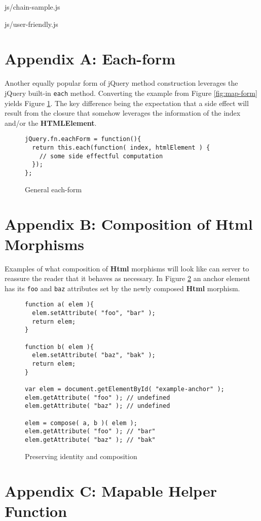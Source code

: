 \documentclass[preprint]{sigplanconf}
\begin{document}
\begin{lstinputlisting}[
    language=JavaScript,
    caption={Sources of Html objects},
    label={lst:chain-sample}
]{js/chain-sample.js}
\begin{lstinputlisting}[
    language=JavaScript,
    caption={User friendly overhead},
    label={lst:user-friendly}
]{js/user-friendly.js}
\appendix
\section{Appendix A: Each-form}

Another equally popular form of jQuery method construction leverages the jQuery built-in \verb|each| method. Converting the example from Figure \ref{fig:map-form} yields Figure \ref{fig:each-form}. The key difference being the expectation that a side effect will result from the closure that somehow leverages the information of the index and/or the \textbf{HTMLElement}.

\begin{figure}[!ht]
\small
\begin{verbatim}
jQuery.fn.eachForm = function(){
  return this.each(function( index, htmlElement ) {
    // some side effectful computation
  });
};
\end{verbatim}
\nocaptionrule \caption{General each-form}
\label{fig:each-form}
\end{figure}

\section{Appendix B: Composition of Html Morphisms}

Examples of what composition of \textbf{Html} morphisms will look like can server to reassure the reader that it behaves as necessary. In Figure \ref{fig:html-compose} an anchor element has its \verb|foo| and \verb|baz| attributes set by the newly composed \textbf{Html} morphism.

\begin{figure}[!ht]
\small
\begin{verbatim}
function a( elem ){
  elem.setAttribute( "foo", "bar" );
  return elem;
}

function b( elem ){
  elem.setAttribute( "baz", "bak" );
  return elem;
}

var elem = document.getElementById( "example-anchor" );
elem.getAttribute( "foo" ); // undefined
elem.getAttribute( "baz" ); // undefined

elem = compose( a, b )( elem );
elem.getAttribute( "foo" ); // "bar"
elem.getAttribute( "baz" ); // "bak"
\end{verbatim}
\nocaptionrule \caption{Preserving identity and composition}
\label{fig:html-compose}
\end{figure}

\section{Appendix C: Mapable Helper Function}


\end{lstinputlisting}
\end{lstinputlisting}
\end{document}
